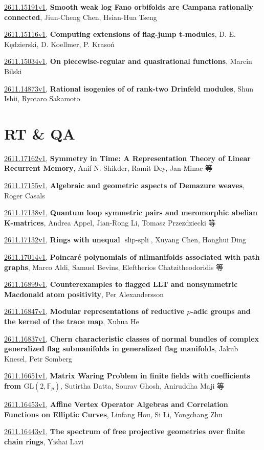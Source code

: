 \documentclass[9pt, a4paper]{article}
\theoremstyle{plain}
\theoremstyle{definition}
\theoremstyle{remark}
\newcommand{\arxiv}[3]{\href{https://arxiv.org/abs/#1}{#1}, \textbf{\textcolor{arxivblue}{#2}}, #3}
\begin{document}
\arxiv{2611.15191v1}{Smooth weak log Fano orbifolds are Campana rationally connected}{Jiun-Cheng Chen, Hsian-Hua Tseng}

\arxiv{2611.15116v1}{Computing extensions of flag-jump t-modules}{D. E. Kędzierski, D. Koellmer, P. Krasoń}

\arxiv{2611.15034v1}{On piecewise-regular and quasirational functions}{Marcin Bilski}

\arxiv{2611.14873v1}{Rational isogenies of of rank-two Drinfeld modules}{Shun Ishii, Ryotaro Sakamoto}


\section{RT \& QA}
\arxiv{2611.17162v1}{Symmetry in Time: A Representation Theory of Linear Recurrent Memory}{Anif N. Shikder, Ramit Dey, Jan Minac 等}

\arxiv{2611.17155v1}{Algebraic and geometric aspects of Demazure weaves}{Roger Casals}

\arxiv{2611.17138v1}{Quantum loop symmetric pairs and meromorphic abelian K-matrices}{Andrea Appel, Jian-Rong Li, Tomasz Przezdziecki 等}

\arxiv{2611.17132v1}{Rings with unequal $\operatorname{slip-spli}$}{Xuyang Chen, Honghui Ding}

\arxiv{2611.17014v1}{Poincaré polynomials of nilmanifolds associated with path graphs}{Marco Aldi, Samuel Bevins, Eleftherios Chatzitheodoridis 等}

\arxiv{2611.16899v1}{Counterexamples to flagged LLT and nonsymmetric Macdonald atom positivity}{Per Alexandersson}

\arxiv{2611.16847v1}{Modular representations of reductive $p$-adic groups and the kernel of the trace map}{Xuhua He}

\arxiv{2611.16837v1}{Chern characteristic classes of normal bundles of complex generalized flag submanifolds in generalized flag manifolds}{Jakub Knesel, Petr Somberg}

\arxiv{2611.16651v1}{Matrix Waring Problem in finite fields with coefficients from $\mathrm{GL}(2, \mathbb{F}_p)$}{Sutirtha Datta, Sourav Ghosh, Aniruddha Maji 等}

\arxiv{2611.16453v1}{Affine Vertex Operator Algebras and Correlation Functions on Elliptic Curves}{Linfang Hou, Si Li, Yongchang Zhu}

\arxiv{2611.16443v1}{The spectrum of free projective geometries over finite chain rings}{Yishai Lavi}
\end{document}
